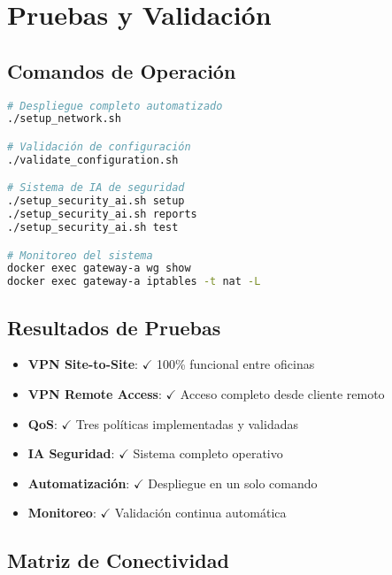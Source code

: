 \section{Pruebas y Validación}

\subsection{Comandos de Operación}

\begin{lstlisting}[language=bash, caption=Comandos principales del sistema]
# Despliegue completo automatizado
./setup_network.sh

# Validación de configuración
./validate_configuration.sh

# Sistema de IA de seguridad
./setup_security_ai.sh setup
./setup_security_ai.sh reports
./setup_security_ai.sh test

# Monitoreo del sistema
docker exec gateway-a wg show
docker exec gateway-a iptables -t nat -L
\end{lstlisting}

\subsection{Resultados de Pruebas}

\begin{exito}
\begin{itemize}
    \item \textbf{VPN Site-to-Site}: $\checkmark$ 100\% funcional entre oficinas
    \item \textbf{VPN Remote Access}: $\checkmark$ Acceso completo desde cliente remoto
    \item \textbf{QoS}: $\checkmark$ Tres políticas implementadas y validadas
    \item \textbf{IA Seguridad}: $\checkmark$ Sistema completo operativo
    \item \textbf{Automatización}: $\checkmark$ Despliegue en un solo comando
    \item \textbf{Monitoreo}: $\checkmark$ Validación continua automática
\end{itemize}
\end{exito}

\subsection{Matriz de Conectividad}

